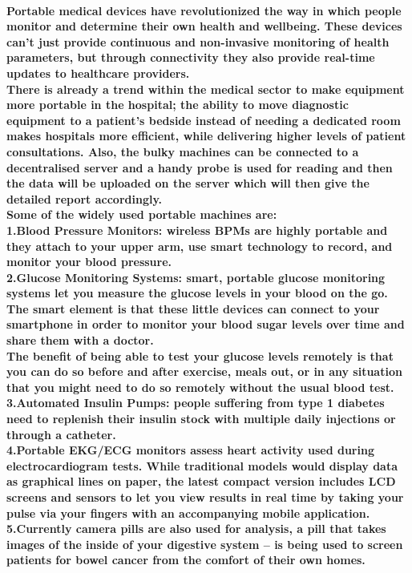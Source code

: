 \documentclass[12pt]{article}
\begin{document}
	\paragraph{Portable medical devices have revolutionized the way in which people monitor and determine their own health and wellbeing. These devices can’t just provide continuous and non-invasive monitoring of health parameters, but through connectivity they also provide real-time updates to healthcare providers.
	\\There is already a trend within the medical sector to make equipment more portable in the hospital; the ability to move diagnostic equipment to a patient's bedside instead of needing a dedicated room makes hospitals more efficient, while delivering higher levels of patient consultations. Also, the bulky machines can be connected to a decentralised server and a handy probe is used for reading and then the data will be uploaded on the server which will then give the detailed report accordingly. 
    \\Some of the widely used portable machines are:
    \\1.Blood Pressure Monitors: wireless BPMs are highly portable and they attach to your upper arm, use smart technology to record, and monitor your blood pressure.
    \\2.Glucose Monitoring Systems: smart, portable glucose monitoring systems let you measure the glucose levels in your blood on the go. The smart element is that these little devices can connect to your smartphone in order to monitor your blood sugar levels over time and share them with a doctor.
    \\The benefit of being able to test your glucose levels remotely is that you can do so before and after exercise, meals out, or in any situation that you might need to do so remotely without the usual blood test.
    \\3.Automated Insulin Pumps: people suffering from type 1 diabetes need to replenish their insulin stock with multiple daily injections or through a catheter.
    \\4.Portable EKG/ECG monitors assess heart activity used during electrocardiogram tests. While traditional models would display data as graphical lines on paper, the latest compact version includes LCD screens and sensors to let you view results in real time by taking your pulse via your fingers with an accompanying mobile application.
    \\5.Currently camera pills are also used for analysis, a pill that takes images of the inside of your digestive system – is being used to screen patients for bowel cancer from the comfort of their own homes.}
\end{document}
